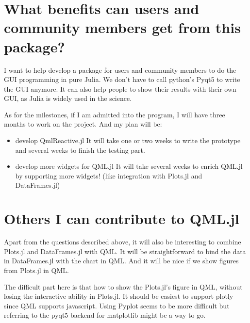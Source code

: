 \documentclass[12pt]{extarticle}
\begin{document}
\section{What benefits can users and community members get from this package?}

I want to help develop a package for users and community members to do the GUI programming in pure Julia. We don't have to call 
python's Pyqt5 to write the GUI anymore. It can also help people to show their results with their own GUI, as Julia is widely used
in the science.

As for the milestones, if I am admitted into the program, I will have three months to work on the project. And my plan will be:
\begin{itemize}
    \item{develop QmlReactive.jl} It will take one or two weeks to write the prototype and several weeks to finish the testing part. 
    \item{develop more widgets for QML.jl} It will take several weeks to enrich QML.jl by supporting more widgets! (like integration with Plots.jl and DataFrames.jl)
\end{itemize}

\section{Others I can contribute to QML.jl}

Apart from the questions described above, it will also be interesting to combine Plots.jl and DataFrames.jl with QML. It will be 
straightforward to bind the data in DataFrames.jl with the chart in QML. And it will be nice if we show figures from Plots.jl in 
QML.

The difficult part here is that how to show the Plots.jl's figure in QML, without losing the interactive ability 
in Plots.jl. It should be easiest to support plotly since QML supports javascript. Using Pyplot seems to be more 
difficult but referring to the pyqt5 backend for matplotlib might be a way to go.
\end{document}
